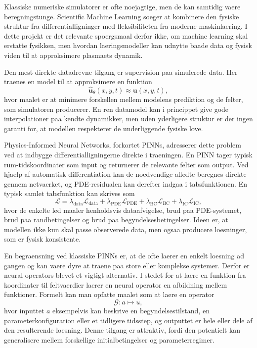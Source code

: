 

Klassiske numeriske simulatorer er ofte noejagtige, men de kan samtidig vaere beregningstunge. Scientific Machine Learning soeger at kombinere den fysiske struktur fra differentialligninger med fleksibiliteten fra moderne maskinlaering. I dette projekt er det relevante spoergsmaal derfor ikke, om machine learning skal erstatte fysikken, men hvordan laeringsmodeller kan udnytte baade data og fysisk viden til at approksimere plasmaets dynamik.

Den mest direkte datadrevne tilgang er supervision paa simulerede data. Her traenes en model til at approksimere en funktion
\[
\hat{\mathbf{u}}_\theta(x,y,t) \approx \mathbf{u}(x,y,t),
\]
hvor maalet er at minimere forskellen mellem modelens prediktion og de felter, som simulatoren producerer. En ren datamodel kan i princippet give gode interpolationer paa kendte dynamikker, men uden yderligere struktur er der ingen garanti for, at modellen respekterer de underliggende fysiske love.

Physics-Informed Neural Networks, forkortet PINNs, adresserer dette problem ved at indbygge differentialligningerne direkte i traeningen. En PINN tager typisk rum-tidskoordinater som input og returnerer de relevante felter som output. Ved hjaelp af automatisk differentiation kan de noedvendige afledte beregnes direkte gennem netvaerket, og PDE-residualen kan derefter indgaa i tabsfunktionen. En typisk samlet tabsfunktion kan skrives som
\[
\mathcal{L} = \lambda_{\text{data}}\mathcal{L}_{\text{data}}
+ \lambda_{\text{PDE}}\mathcal{L}_{\text{PDE}}
+ \lambda_{\text{BC}}\mathcal{L}_{\text{BC}}
+ \lambda_{\text{IC}}\mathcal{L}_{\text{IC}},
\]
hvor de enkelte led maaler henholdsvis dataafvigelse, brud paa PDE-systemet, brud paa randbetingelser og brud paa begyndelsesbetingelser. Ideen er, at modellen ikke kun skal passe observerede data, men ogsaa producere loesninger, som er fysisk konsistente.

En begraensning ved klassiske PINNs er, at de ofte laerer en enkelt loesning ad gangen og kan vaere dyre at traene paa store eller komplekse systemer. Derfor er neural operators blevet et vigtigt alternativ. I stedet for at laere en funktion fra koordinater til feltvaerdier laerer en neural operator en afbildning mellem funktioner. Formelt kan man opfatte maalet som at laere en operator
\[
\mathcal{G}: a \mapsto u,
\]
hvor inputtet $a$ eksempelvis kan beskrive en begyndelsestilstand, en parameterkonfiguration eller et tidligere tidsstep, og outputtet er hele eller dele af den resulterende loesning. Denne tilgang er attraktiv, fordi den potentielt kan generalisere mellem forskellige initialbetingelser og parameterregimer.

